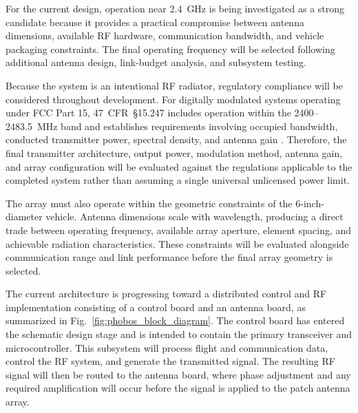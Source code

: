 For the current design, operation near \SI{2.4}{\giga\hertz} is being investigated as a strong candidate because it provides a practical compromise between antenna dimensions, available RF hardware, communication bandwidth, and vehicle packaging constraints. The final operating frequency will be selected following additional antenna design, link-budget analysis, and subsystem testing.

Because the system is an intentional RF radiator, regulatory compliance will be considered throughout development. For digitally modulated systems operating under FCC Part 15, 47~CFR~\S15.247 includes operation within the 2400--2483.5~MHz band and establishes requirements involving occupied bandwidth, conducted transmitter power, spectral density, and antenna gain \cite{fcc247}. Therefore, the final transmitter architecture, output power, modulation method, antenna gain, and array configuration will be evaluated against the regulations applicable to the completed system rather than assuming a single universal unlicensed power limit.

The array must also operate within the geometric constraints of the 6-inch-diameter vehicle. Antenna dimensions scale with wavelength, producing a direct trade between operating frequency, available array aperture, element spacing, and achievable radiation characteristics. These constraints will be evaluated alongside communication range and link performance before the final array geometry is selected.

The current \phobos{} architecture is progressing toward a distributed control and RF implementation consisting of a control board and an antenna board, as summarized in Fig.~\ref{fig:phobos_block_diagram}. The control board has entered the schematic design stage and is intended to contain the primary transceiver and microcontroller. This subsystem will process flight and communication data, control the RF system, and generate the transmitted signal. The resulting RF signal will then be routed to the antenna board, where phase adjustment and any required amplification will occur before the signal is applied to the patch antenna array.



